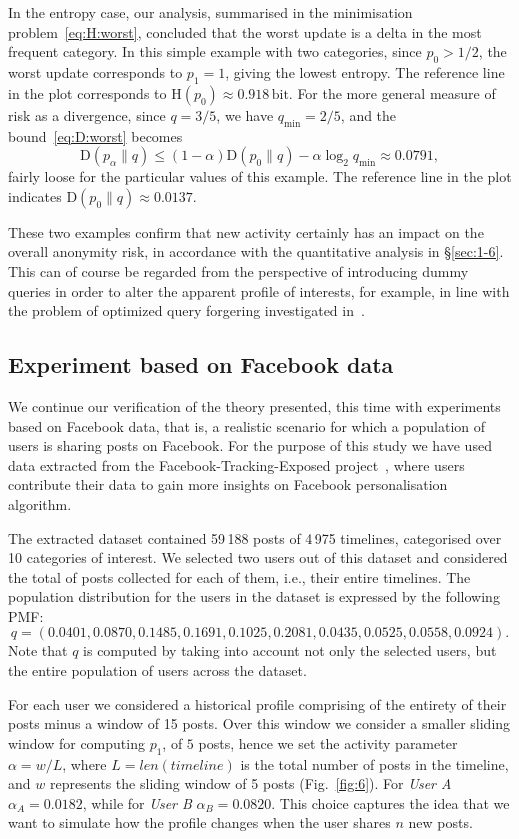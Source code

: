 In the entropy case, our analysis, summarised in the minimisation problem~\eqref{eq:H:worst}, concluded that the worst update is a delta in the most frequent category. In this simple example with two categories, since $p_0>1/2$, the worst update corresponds to $p_1=1$, giving the lowest entropy. The reference line in the plot corresponds to $\mathrm{H}(p_0)\approx 0.918\,\text{bit}$.
For the more general measure of risk as a divergence, since $q=3/5$, we have $q_\mathrm{min}=2/5$, and the bound~\eqref{eq:D:worst} becomes
$$\mathrm{D}(p_\alpha\|q) \leqslant (1-\alpha) \mathrm{D}(p_0\|q) - \alpha \log_2 q_\mathrm{min} \approx 0.0791,$$
fairly loose for the particular values of this example. The reference line in the plot indicates
$\mathrm{D}(p_0\|q)\approx 0.0137$.

These two examples confirm that new activity certainly has an impact on the overall anonymity risk, in accordance with the quantitative analysis in \S\ref{sec:1-6}. This can of course be regarded from the perspective of introducing dummy queries in order to alter the apparent profile of interests, for example, in line with the problem of optimized query forgering investigated in~\cite{rebollo2010optimized}.

\subsection{Experiment based on Facebook data}

\noindent
We continue our verification of the theory presented, this time with experiments based on Facebook data, that is, a realistic scenario for which a population of users is sharing posts on Facebook. For the purpose of this study we have used data extracted from the Facebook-Tracking-Exposed project~\cite{FTE}, where users contribute their data to gain more insights on Facebook personalisation algorithm.

The extracted dataset contained 59\,188 posts of 4\,975 timelines, categorised over 10 categories of interest. We selected two users out of this dataset and considered the total of posts collected for each of them, i.e., their entire timelines. The population distribution for the users in the dataset is expressed by the following PMF: 
$$q=(0.0401,0.0870,0.1485,0.1691,0.1025,0.2081,0.0435,0.0525,0.0558,0.0924).$$
Note that $q$ is computed by taking into account not only the selected users, but the entire population of users across the dataset.

For each user we considered a historical profile comprising of the entirety of their posts minus a window of 15 posts. Over this window we consider a smaller sliding window for computing $p_1$, of $5$ posts, hence we set the activity parameter $\alpha = w/L$, where $L=len(timeline)$ is the total number of posts in the timeline, and $w$ represents the sliding window of 5 posts (Fig.~\ref{fig:6}). For \emph{User A} $\alpha_A = 0.0182$, while for \emph{User B} $\alpha_B= 0.0820$. This choice captures the idea that we want to simulate how the profile changes when the user shares $n$ new posts.

